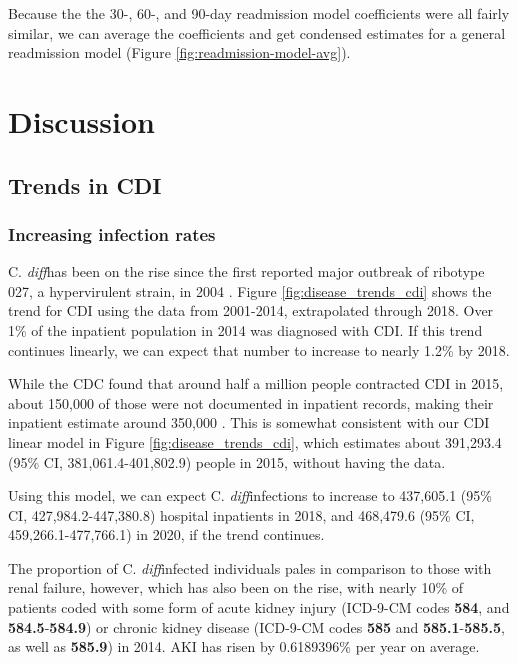\documentclass[12pt]{ociamthesis}\usepackage[]{graphicx}\usepackage[]{color}
\newcommand{\cdiff}{C. \textit{diff}}
\newcommand{\ci}[3]{#1 (95\% CI, #2-#3)}
\begin{document}
Because the the 30-, 60-, and 90-day readmission model coefficients were all fairly similar, 
we can average the coefficients and get condensed estimates for a general readmission model (Figure \ref{fig:readmission-model-avg}).




\chapter{Discussion}

\section{Trends in CDI}


\subsection{Increasing infection rates}

\cdiff has been on the rise since the first reported major outbreak of ribotype 027, a hypervirulent strain, in 2004 \cite{Pepin2004}. 
Figure \ref{fig:disease_trends_cdi} shows the trend for CDI using the data from 2001-2014, extrapolated through 2018. 
Over 1\% of the inpatient population in 2014 was diagnosed with CDI. If this trend continues linearly, we can expect that number
to increase to nearly 1.2\% by 2018. 

While the CDC found that around half a million people contracted CDI in 2015, about 150,000 of those were not documented in 
inpatient records, making their inpatient estimate around 350,000 \cite{CDC2018}. This is somewhat consistent with our CDI linear model in 
Figure \ref{fig:disease_trends_cdi}, which estimates about \ci{391,293.4}{381,061.4}{401,802.9} people in 2015,
without having the data.

Using this model, we can expect \cdiff infections to increase to \ci{437,605.1}{427,984.2}{447,380.8} hospital inpatients in 2018, and
\ci{468,479.6}{459,266.1}{477,766.1} in 2020, if the trend continues.




The proportion of \cdiff infected individuals pales in comparison to those with renal failure, however, 
which has also been on the rise, with nearly 10\% of patients coded with
some form of acute kidney injury (ICD-9-CM codes \textbf{584}, and \textbf{584.5}-\textbf{584.9}) or chronic kidney disease 
(ICD-9-CM codes \textbf{585} and \textbf{585.1}-\textbf{585.5}, as well as \textbf{585.9}) in 2014. AKI has risen 
by 0.6189396\% per year on average.
\end{document}
